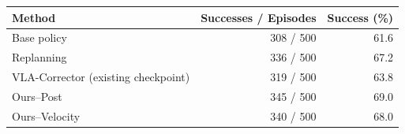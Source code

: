 \begin{tabular}{lrr}
\hline
Method & Successes / Episodes & Success (\%) \\
\hline
Base policy & 308 / 500 & 61.6 \\
Replanning & 336 / 500 & 67.2 \\
VLA-Corrector (existing checkpoint) & 319 / 500 & 63.8 \\
Ours--Post & 345 / 500 & 69.0 \\
Ours--Velocity & 340 / 500 & 68.0 \\
\hline
\end{tabular}
